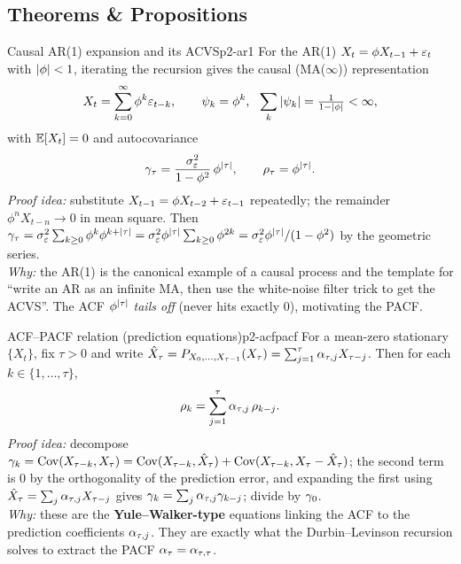 \subsection{Theorems \& Propositions}

\begin{proposition}{Causal AR(1) expansion and its ACVS}{p2-ar1}
For the AR(1) $X_t=\phi X_{t-1}+\varepsilon_t$ with $\left\lvert \phi \right\rvert<1$, iterating the
recursion gives the causal (MA($\infty$)) representation
\[
X_t=\sum_{k=0}^{\infty}\phi^{k}\eps_{t-k},
\qquad \psi_k=\phi^k,\ \ \sum_k\abs{\psi_k}=\tfrac1{1-\abs\phi}<\infty,
\]
with $\mathbb{E}[X_t]=0$ and autocovariance
\[
\gamma_\tau=\frac{\sigma_\varepsilon^2}{1-\phi^2}\,\phi^{\left\lvert \tau \right\rvert},
\qquad
\rho_\tau=\phi^{\left\lvert \tau \right\rvert}.
\]
\textit{Proof idea:} substitute $X_{t-1}=\phi X_{t-2}+\varepsilon_{t-1}$ repeatedly;
the remainder $\phi^{n}X_{t-n}\to0$ in mean square. Then
$\gamma_\tau=\sigma_\varepsilon^2\sum_{k\ge0}\phi^k\phi^{k+\left\lvert \tau \right\rvert}
=\sigma_\varepsilon^2\phi^{\left\lvert \tau \right\rvert}\sum_{k\ge0}\phi^{2k}
=\sigma_\varepsilon^2\phi^{\left\lvert \tau \right\rvert}/(1-\phi^2)$ by the geometric series.\\
\textit{Why:} the AR(1) is the canonical example of a causal process and the
template for ``write an AR as an infinite MA, then use the white-noise filter
trick to get the ACVS''. The ACF $\phi^{\left\lvert \tau \right\rvert}$ \emph{tails off} (never hits
exactly $0$), motivating the PACF.
\end{proposition}

\begin{proposition}{ACF--PACF relation (prediction equations)}{p2-acfpacf}
For a mean-zero stationary $\{X_t\}$, fix $\tau>0$ and write
$\hat X_\tau=P_{X_0,\dots,X_{\tau-1}}(X_\tau)=\sum_{j=1}^{\tau}\alpha_{\tau,j}X_{\tau-j}$.
Then for each $k\in\{1,\dots,\tau\}$,
\[
\rho_k=\sum_{j=1}^{\tau}\alpha_{\tau,j}\,\rho_{k-j}.
\]
\textit{Proof idea:} decompose
$\gamma_k=\operatorname{Cov}(X_{\tau-k},X_\tau)
=\operatorname{Cov}(X_{\tau-k},\hat X_\tau)+\operatorname{Cov}(X_{\tau-k},X_\tau-\hat X_\tau)$;
the second term is $0$ by the orthogonality of the prediction error, and
expanding the first using $\hat X_\tau=\sum_j\alpha_{\tau,j}X_{\tau-j}$ gives
$\gamma_k=\sum_j\alpha_{\tau,j}\gamma_{k-j}$; divide by $\gamma_0$.\\
\textit{Why:} these are the \textbf{Yule--Walker-type} equations linking the ACF
to the prediction coefficients $\alpha_{\tau,j}$. They are exactly what the
Durbin--Levinson recursion solves to extract the PACF
$\alpha_\tau=\alpha_{\tau,\tau}$.
\end{proposition}

